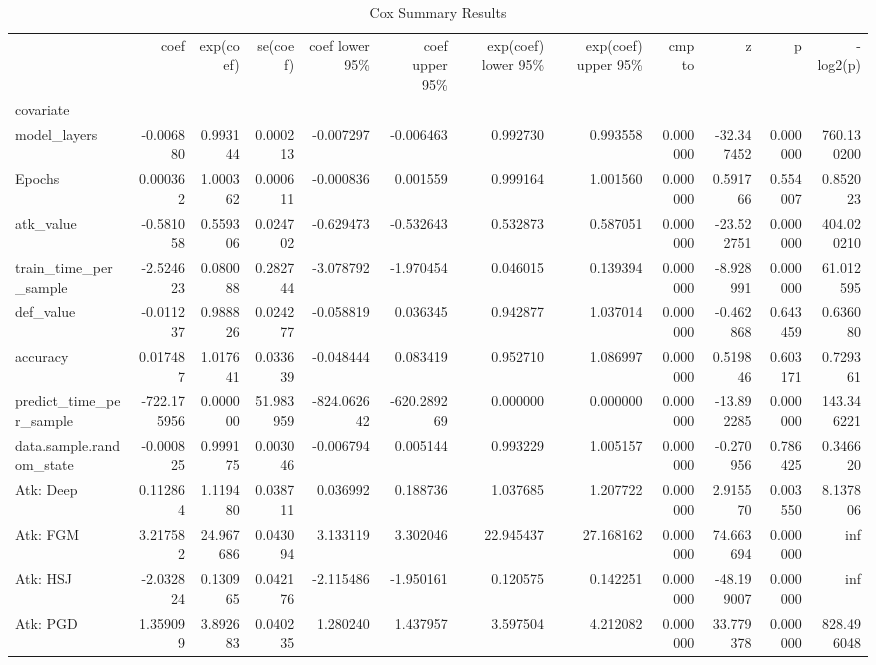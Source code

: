 \begin{table}[htbp]
\caption{Cox Summary Results}
\label{tab:cox_summary}
\begin{tabular}{lrrrrrrrrrrr}
\toprule
 & coef & exp(coef) & se(coef) & coef lower 95\% & coef upper 95\% & exp(coef) lower 95\% & exp(coef) upper 95\% & cmp to & z & p & -log2(p) \\
covariate &  &  &  &  &  &  &  &  &  &  &  \\
\midrule
model\_layers & -0.006880 & 0.993144 & 0.000213 & -0.007297 & -0.006463 & 0.992730 & 0.993558 & 0.000000 & -32.347452 & 0.000000 & 760.130200 \\
Epochs & 0.000362 & 1.000362 & 0.000611 & -0.000836 & 0.001559 & 0.999164 & 1.001560 & 0.000000 & 0.591766 & 0.554007 & 0.852023 \\
atk\_value & -0.581058 & 0.559306 & 0.024702 & -0.629473 & -0.532643 & 0.532873 & 0.587051 & 0.000000 & -23.522751 & 0.000000 & 404.020210 \\
train\_time\_per\_sample & -2.524623 & 0.080088 & 0.282744 & -3.078792 & -1.970454 & 0.046015 & 0.139394 & 0.000000 & -8.928991 & 0.000000 & 61.012595 \\
def\_value & -0.011237 & 0.988826 & 0.024277 & -0.058819 & 0.036345 & 0.942877 & 1.037014 & 0.000000 & -0.462868 & 0.643459 & 0.636080 \\
accuracy & 0.017487 & 1.017641 & 0.033639 & -0.048444 & 0.083419 & 0.952710 & 1.086997 & 0.000000 & 0.519846 & 0.603171 & 0.729361 \\
predict\_time\_per\_sample & -722.175956 & 0.000000 & 51.983959 & -824.062642 & -620.289269 & 0.000000 & 0.000000 & 0.000000 & -13.892285 & 0.000000 & 143.346221 \\
data.sample.random\_state & -0.000825 & 0.999175 & 0.003046 & -0.006794 & 0.005144 & 0.993229 & 1.005157 & 0.000000 & -0.270956 & 0.786425 & 0.346620 \\
Atk: Deep & 0.112864 & 1.119480 & 0.038711 & 0.036992 & 0.188736 & 1.037685 & 1.207722 & 0.000000 & 2.915570 & 0.003550 & 8.137806 \\
Atk: FGM & 3.217582 & 24.967686 & 0.043094 & 3.133119 & 3.302046 & 22.945437 & 27.168162 & 0.000000 & 74.663694 & 0.000000 & inf \\
Atk: HSJ & -2.032824 & 0.130965 & 0.042176 & -2.115486 & -1.950161 & 0.120575 & 0.142251 & 0.000000 & -48.199007 & 0.000000 & inf \\
Atk: PGD & 1.359099 & 3.892683 & 0.040235 & 1.280240 & 1.437957 & 3.597504 & 4.212082 & 0.000000 & 33.779378 & 0.000000 & 828.496048 \\

\end{tabular}
\end{table}

